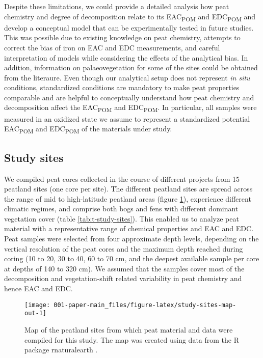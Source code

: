 \documentclass[alpha-refs, lineno]{wiley-article-rmd}
\begin{document}
Despite these limitations, we could provide a detailed analysis how peat chemistry and degree of decomposition relate to its EAC\textsubscript{POM} and EDC\textsubscript{POM} and develop a conceptual model that can be experimentally tested in future studies. This was possible due to existing knowledge on peat chemistry, attempts to correct the bias of iron on EAC and EDC measurements, and careful interpretation of models while considering the effects of the analytical bias. In addition, information on palaeovegetation for some of the sites could be obtained from the literaure. Even though our analytical setup does not represent \emph{in situ} conditions, standardized conditions are mandatory to make peat properties comparable and are helpful to conceptually understand how peat chemistry and decomposition affect the EAC\textsubscript{POM} and EDC\textsubscript{POM}. In particular, all samples were measured in an oxidized state we assume to represent a standardized potential EAC\textsubscript{POM} and EDC\textsubscript{POM} of the materials under study.

\hypertarget{study-sites}{%
\subsection{Study sites}\label{study-sites}}

We compiled peat cores collected in the course of different projects from 15 peatland sites (one core per site). The different peatland sites are spread across the range of mid to high-latitude peatland areas (figure \ref{fig:study-sites-map-out}), experience different climatic regimes, and comprise both bogs and fens with different dominant vegetation cover (table \ref{tab:t-study-sites}). This enabled us to analyze peat material with a representative range of chemical properties and EAC and EDC.\\
Peat samples were selected from four approximate depth levels, depending on the vertical resolution of the peat cores and the maximum depth reached during coring (10 to 20, 30 to 40, 60 to 70 cm, and the deepest available sample per core at depths of 140 to 320 cm). We assumed that the samples cover most of the decomposition and vegetation-shift related variability in peat chemistry and hence EAC and EDC.

\begin{figure}[H]

{\centering \texttt{[image: 001-paper-main\_files/figure-latex/study-sites-map-out-1]}

}

\caption{Map of the peatland sites from which peat material and data were compiled for this study. The map was created using data from the R package rnaturalearth \autocite{South.2017}.}\label{fig:study-sites-map-out}
\end{figure}
\end{document}
